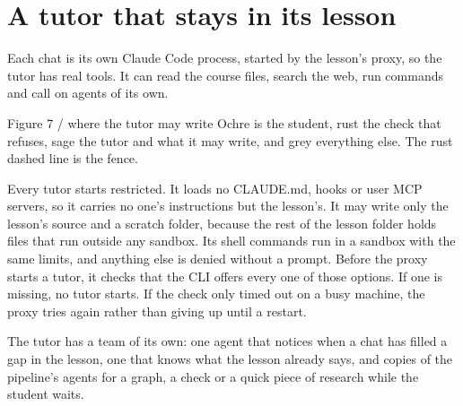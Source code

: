 \documentclass[11pt]{article}
\begin{document}
\newpage

\section{A tutor that stays in its lesson}


Each chat is its own Claude Code process, started by the lesson's proxy, so the tutor has real
tools. It can read the course files, search the web, run commands and call on agents of its own.

\begin{hsfigure}{Figure 7 / where the tutor may write}%
{Ochre is the student, rust the check that refuses, sage the tutor and what it may
write, and grey everything else. The rust dashed line is the fence.}
\end{hsfigure}

Every tutor starts restricted. It loads no CLAUDE.md, hooks or user MCP servers, so it carries
no one's instructions but the lesson's. It may write only the lesson's source and a scratch
folder, because the rest of the lesson folder holds files that run outside any sandbox. Its
shell commands run in a sandbox with the same limits, and anything else is denied without a
prompt. Before the proxy starts a tutor, it checks that the CLI offers every one of those
options. If one is missing, no tutor starts. If the check only timed out on a busy machine, the
proxy tries again rather than giving up until a restart.

The tutor has a team of its own: one agent that notices when a chat has filled a gap in the
lesson, one that knows what the lesson already says, and copies of the pipeline's agents for a
graph, a check or a quick piece of research while the student waits.

\newpage
\end{document}

